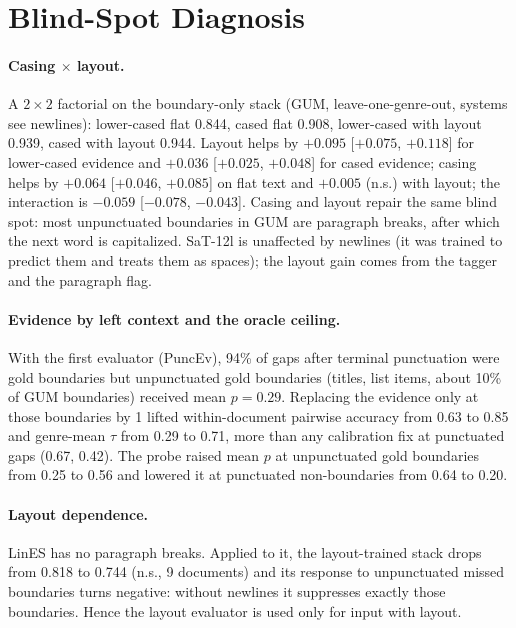 
\section{Blind-Spot Diagnosis}
\label{app:blindspots}
\paragraph{Casing $\times$ layout.} A $2 \times 2$ factorial on the boundary-only stack (GUM, leave-one-genre-out, systems
see newlines): lower-cased flat 0.844, cased flat 0.908, lower-cased with layout 0.939, cased with layout 0.944. Layout
helps by $+0.095$ [$+0.075$, $+0.118$] for lower-cased evidence and $+0.036$ [$+0.025$, $+0.048$] for cased evidence;
casing helps by $+0.064$ [$+0.046$, $+0.085$] on flat text and $+0.005$ (n.s.) with layout; the interaction is $-0.059$
[$-0.078$, $-0.043$]. Casing and layout repair
the same blind spot: most unpunctuated boundaries in GUM are paragraph breaks, after which the next word is
capitalized. SaT-12l is unaffected by newlines (it was trained to predict them and treats them as spaces); the layout
gain comes from the tagger and the paragraph flag.

\paragraph{Evidence by left context and the oracle ceiling.} With the first evaluator (PuncEv), 94\% of gaps after
terminal punctuation were gold boundaries but unpunctuated gold boundaries (titles, list items, about 10\% of GUM
boundaries) received mean $p = 0.29$. Replacing the evidence only at those boundaries by 1 lifted within-document
pairwise accuracy from 0.63 to 0.85 and genre-mean $\tau$ from 0.29 to 0.71, more than any calibration fix at punctuated
gaps (0.67, 0.42). The probe raised mean $p$ at unpunctuated gold boundaries from 0.25 to 0.56 and lowered it at
punctuated non-boundaries from 0.64 to 0.20.

\paragraph{Layout dependence.} LinES has no paragraph breaks. Applied to it, the layout-trained stack drops from 0.818 to
0.744 (n.s., 9 documents) and its response to unpunctuated missed boundaries turns negative: without newlines it suppresses exactly those
boundaries. Hence the layout evaluator is used only for input with layout.
